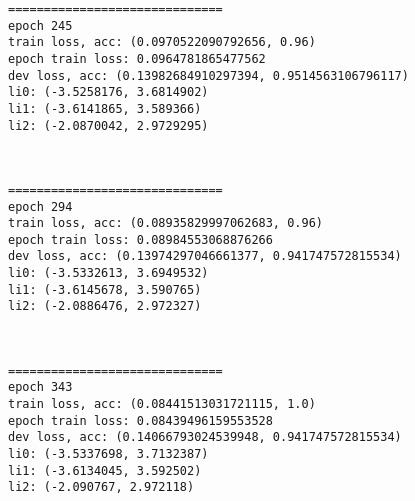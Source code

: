 \documentclass[11pt]{article}
\begin{document}
    \begin{Verbatim}[commandchars=\\\{\}]
==============================
epoch 245
train loss, acc: (0.0970522090792656, 0.96)
epoch train loss: 0.0964781865477562
dev loss, acc: (0.13982684910297394, 0.9514563106796117)
li0: (-3.5258176, 3.6814902)
li1: (-3.6141865, 3.589366)
li2: (-2.0870042, 2.9729295)

    \end{Verbatim}

    \begin{center}
    \end{center}
    { \hspace*{\fill} \\}
    
    \begin{Verbatim}[commandchars=\\\{\}]
==============================
epoch 294
train loss, acc: (0.08935829997062683, 0.96)
epoch train loss: 0.08984553068876266
dev loss, acc: (0.13974297046661377, 0.941747572815534)
li0: (-3.5332613, 3.6949532)
li1: (-3.6145678, 3.590765)
li2: (-2.0886476, 2.972327)

    \end{Verbatim}

    \begin{center}
    \end{center}
    { \hspace*{\fill} \\}
    
    \begin{Verbatim}[commandchars=\\\{\}]
==============================
epoch 343
train loss, acc: (0.08441513031721115, 1.0)
epoch train loss: 0.08439496159553528
dev loss, acc: (0.14066793024539948, 0.941747572815534)
li0: (-3.5337698, 3.7132387)
li1: (-3.6134045, 3.592502)
li2: (-2.090767, 2.972118)

    \end{Verbatim}

    \begin{center}
    \end{center}
    { \hspace*{\fill} \\}
    
\end{document}

